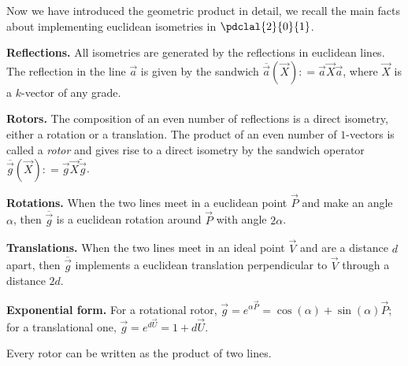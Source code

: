 \documentclass[12pt]{article}
\newcommand{\fvsh}[2]{\ifthenelse{\equal{\isFV}{true}}{#1}{#2}}
\newcommand{\mydogblue}{{\color{gray} $\square$~~}}
\begin{document}
{
Now we have introduced the geometric product in detail, we recall the main facts about implementing euclidean isometries  in $\pdclal{2}{0}{1}$.  
\begin{compactenum}
\item \textbf{Reflections.}  All isometries are generated by the reflections in euclidean lines.  The reflection in the line $\vec{a}$ is given by the sandwich $\overline{\vec{a}}(\vec{X}) : =  \vec{a}\vec{X} \vec{a}$, where $\vec{X}$  is a $k$-vector of any grade.
\item \textbf{Rotors.} The composition of an even number of reflections is a direct isometry, either a rotation or a translation.  The product of an even number of $1$-vectors  is called a \emph{rotor} and gives rise to a direct isometry  by the sandwich operator $\overline{\vec{g}}(\vec{X}) : =  \vec{g}\vec{X} \widetilde{\vec{g}}$. 
\item \textbf{Rotations.}  When the two lines meet in a euclidean point $\vec{P}$ and make an angle $\alpha$, then $\overline{\vec{g}}$ is a euclidean rotation around $\vec{P}$ with angle $2 \alpha$.   
\item \textbf{Translations.} When the two lines meet in an ideal point $\vec{V}$ and are a distance $d$ apart, then $\overline{\vec{g}}$ implements a euclidean translation perpendicular to $\vec{V}$ through a distance $2d$.  
\item \textbf{Exponential form.} For a rotational rotor,  $\vec{g} = e^{{\alpha \vec{P}}} = \cos{(\alpha)} + \sin{(\alpha)} \vec{P}$; for a translational one, $\vec{g} = e^{{d \vec{U}}} = 1 + d \vec{U}$.
\end{compactenum}
\myexercise  Every rotor can be written as the product of two lines. %

}

\end{document}
